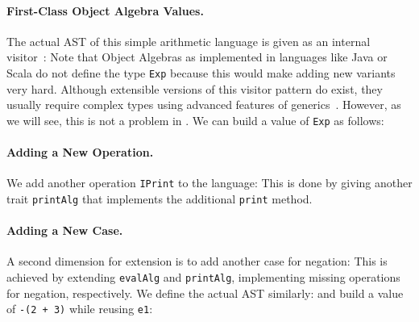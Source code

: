 \paragraph{First-Class Object Algebra Values.}
The actual AST of this simple arithmetic language is given as an internal
visitor~\citep{Oliveira_2008}:
Note that Object Algebras as implemented in languages like Java or Scala do not define the type
\lstinline{Exp} because this would make adding new variants very hard. Although extensible versions
of this visitor pattern do exist, they usually require complex types using advanced features of
generics~\citep{oliveira2012extensibility, togersen:2004}.
However, as we will see, this is not a problem in \sedel. We can build a value of \lstinline{Exp} as follows:


\paragraph{Adding a New Operation.}
We add another operation \lstinline{IPrint} to the language:
This is done by giving another trait \lstinline{printAlg} that implements the
additional \lstinline{print} method.


\paragraph{Adding a New Case.}
A second dimension for extension is to add another case for negation:
This is achieved by extending \lstinline{evalAlg} and \lstinline{printAlg}, implementing
missing operations for negation, respectively. We define the actual AST similarly:
and build a value of \lstinline{-(2 + 3)} while reusing \lstinline{e1}:

